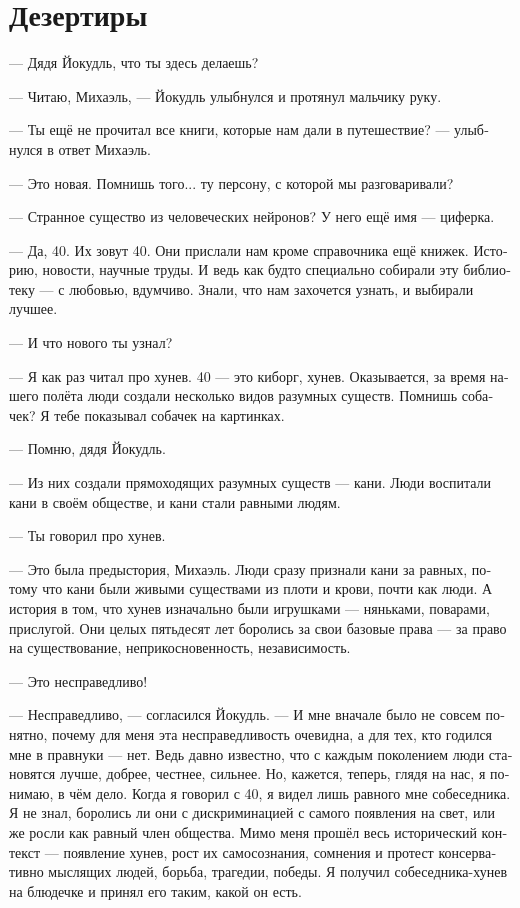 \documentclass[a4paper,12pt,fleqn]{book}\usepackage{polyglossia}\setdefaultlanguage[babelshorthands=true]{russian}\setotherlanguage{english}\defaultfontfeatures{Ligatures=TeX,Mapping=tex-text}\usepackage{xcolor}\newcommand{\ml}[3]{#2}
\begin{document}
\section{Дезертиры}

--- Дядя Йокудль, что ты здесь делаешь?

--- Читаю, Михаэль, --- Йокудль улыбнулся и протянул мальчику руку.

--- Ты ещё не прочитал все книги, которые нам дали в путешествие? --- улыбнулся в ответ Михаэль.

--- Это новая.
Помнишь того... ту персону, с которой мы разговаривали?

--- Странное существо из человеческих нейронов?
У него ещё имя --- циферка.

--- Да, 40.
Их зовут 40.
Они прислали нам кроме справочника ещё книжек.
Историю, новости, научные труды.
И ведь как будто специально собирали эту библиотеку --- с любовью, вдумчиво.
Знали, что нам захочется узнать, и выбирали лучшее.

--- И что нового ты узнал?

--- Я как раз читал про хунев.
40 --- это киборг, хунев.
Оказывается, за время нашего полёта люди создали несколько видов разумных существ.
Помнишь собачек?
Я тебе показывал собачек на картинках.

--- Помню, дядя Йокудль.

--- Из них создали прямоходящих разумных существ --- кани.
Люди воспитали кани в своём обществе, и кани стали равными людям.

--- Ты говорил про хунев.

--- Это была предыстория, Михаэль.
Люди сразу признали кани за равных, потому что кани были живыми существами из плоти и крови, почти как люди.
А история в том, что хунев изначально были игрушками --- няньками, поварами, прислугой.
Они целых пятьдесят лет боролись за свои базовые права --- за право на существование, неприкосновенность, независимость.

--- Это несправедливо!

--- Несправедливо, --- согласился Йокудль.
--- И мне вначале было не совсем понятно, почему для меня эта несправедливость очевидна, а для тех, кто годился мне в правнуки --- нет.
Ведь давно известно, что с каждым поколением люди становятся лучше, добрее, честнее, сильнее.
Но, кажется, теперь, глядя на нас, я понимаю, в чём дело.
Когда я говорил с 40, я видел лишь равного мне собеседника.
Я не знал, боролись ли они с дискриминацией с самого появления на свет, или же росли как равный член общества.
Мимо меня прошёл весь исторический контекст --- появление хунев, рост их самосознания, сомнения и протест консервативно мыслящих людей, борьба, трагедии, победы.
Я получил собеседника-хунев на блюдечке и принял его таким, какой он есть.
\end{document}
